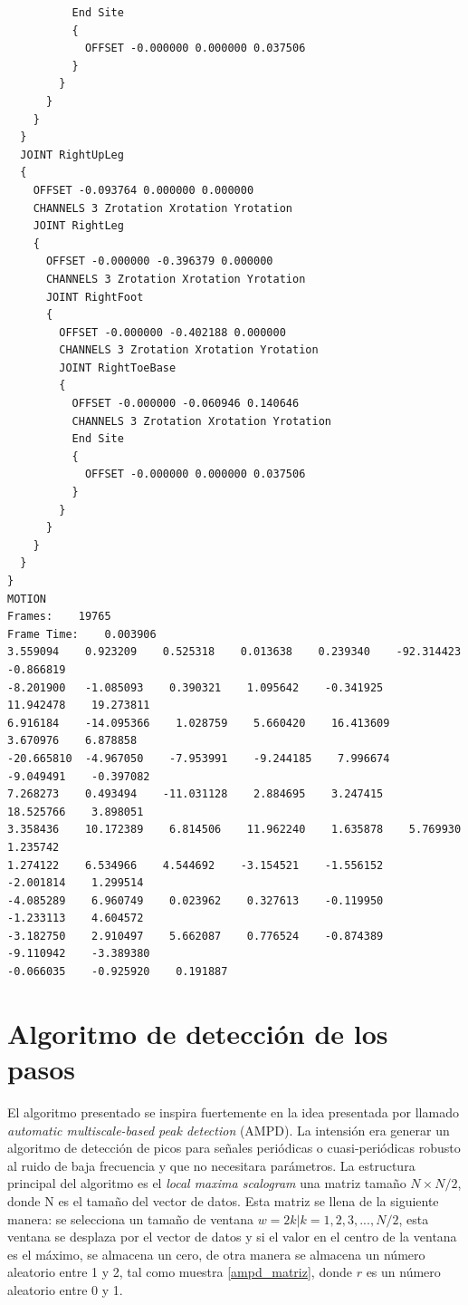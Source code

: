 \begin{verbatim}
          End Site
          {
            OFFSET -0.000000 0.000000 0.037506
          }
        }
      }
    }
  }
  JOINT RightUpLeg
  {
    OFFSET -0.093764 0.000000 0.000000
    CHANNELS 3 Zrotation Xrotation Yrotation
    JOINT RightLeg
    {
      OFFSET -0.000000 -0.396379 0.000000
      CHANNELS 3 Zrotation Xrotation Yrotation
      JOINT RightFoot
      {
        OFFSET -0.000000 -0.402188 0.000000
        CHANNELS 3 Zrotation Xrotation Yrotation
        JOINT RightToeBase
        {
          OFFSET -0.000000 -0.060946 0.140646
          CHANNELS 3 Zrotation Xrotation Yrotation
          End Site
          {
            OFFSET -0.000000 0.000000 0.037506
          }
        }
      }
    }
  }
}
MOTION
Frames:    19765
Frame Time:    0.003906
3.559094    0.923209    0.525318    0.013638    0.239340    -92.314423    -0.866819    
-8.201900   -1.085093    0.390321    1.095642    -0.341925    11.942478    19.273811
6.916184    -14.095366    1.028759    5.660420    16.413609    3.670976    6.878858
-20.665810  -4.967050    -7.953991    -9.244185    7.996674    -9.049491    -0.397082
7.268273    0.493494    -11.031128    2.884695    3.247415    18.525766    3.898051
3.358436    10.172389    6.814506    11.962240    1.635878    5.769930    1.235742
1.274122    6.534966    4.544692    -3.154521    -1.556152    -2.001814    1.299514
-4.085289    6.960749    0.023962    0.327613    -0.119950    -1.233113    4.604572
-3.182750    2.910497    5.662087    0.776524    -0.874389    -9.110942    -3.389380
-0.066035    -0.925920    0.191887    
\end{verbatim}

\chapter{Algoritmo de detección de los pasos}

El algoritmo presentado se inspira fuertemente en la idea presentada por \cite{scholkmann} llamado \emph{automatic multiscale-based peak detection} (AMPD). La intensión era generar un algoritmo de detección de picos para señales periódicas o cuasi-periódicas robusto al ruido de baja frecuencia y que no necesitara parámetros. La estructura principal del algoritmo es el \emph{local maxima scalogram} una matriz tamaño $N \times N/2$, donde N es el tamaño del vector de datos. Esta matriz se llena de la siguiente manera: se selecciona un tamaño de ventana $w = 2k | k = 1, 2, 3, ..., N/2$, esta ventana se desplaza por el vector de datos y si el valor en el centro de la ventana es el máximo, se almacena un cero, de otra manera se almacena un número aleatorio entre 1 y 2, tal como muestra \eqref{ampd_matriz}, donde $r$ es un número aleatorio entre 0 y 1.

